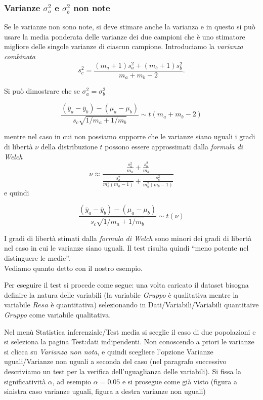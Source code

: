 \documentclass[
  11pt,
]{book}
\begin{document}
\hypertarget{varianze-sigma2_a-e-sigma2_b-non-note}{%
\subsubsection{\texorpdfstring{Varianze \(\sigma^2_a\) e \(\sigma^2_b\) non note}{Varianze \textbackslash sigma\^{}2\_a e \textbackslash sigma\^{}2\_b non note}}\label{varianze-sigma2_a-e-sigma2_b-non-note}}

Se le varianze non sono note, si deve stimare anche la varianza e in questo si può usare la media ponderata delle varianze dei due campioni che è uno stimatore migliore delle singole varianze di ciascun campione.
Introduciamo la \emph{varianza combinata}
\[
s_c^2 = \frac{(m_a+1)s_a^2+(m_b+1)s_b^2}{m_a+m_b-2}.
\]

Si può dimostrare che se \(\sigma^2_a=\sigma^2_b\)

\[
\frac{(\bar y_a - \bar y_b)-(\mu_a-\mu_b)}{s_c\sqrt{1/m_a+1/m_b}} \sim t(m_a+m_b-2)
\]

mentre nel caso in cui non possiamo supporre che le varianze siano uguali i gradi di libertà \(\nu\) della distribuzione \(t\) possono essere approssimati dalla \emph{formula di Welch}
\[
\nu \approx \frac{\frac{s^2_a}{m_a}+\frac{s^2_b}{m_b}}{\frac{s^2_a}{m_a^2(m_a-1)}+\frac{s^2_b}{m_b^2(m_b-1)}}
\]
e quindi

\[
\frac{(\bar y_a - \bar y_b)-(\mu_a-\mu_b)}{s_c\sqrt{1/m_a+1/m_b}} \sim t(\nu)
\]

I gradi di libertà stimati dalla \emph{formula di Welch} sono minori dei gradi di libertà nel caso in cui le varianze siano uguali. Il test risulta quindi ``meno potente nel distinguere le medie''.\\
Vediamo quanto detto con il nostro esempio.

Per eseguire il test si procede come segue: una volta caricato il dataset bisogna definire la natura delle variabili (la variabile \emph{Gruppo} è qualitativa mentre la variabile \(Resa\) è quantitativa) selezionando in Dati/Variabili/Variabili quantitaive \emph{Gruppo} come variabile qualitativa.

Nel menù Statistica inferenziale/Test media si sceglie il caso di due popolazioni e si seleziona la pagina Test:dati indipendenti. Non conoscendo a priori le varianze si clicca su \emph{Varianza non nota}, e quindi scegliere l'opzione Varianze uguali/Varianze non uguali a seconda del caso (nel paragrafo successivo descriviamo un test per la verifica dell'uguaglianza delle variabili).
Si fissa la significatività \(\alpha\), ad esempio \(\alpha = 0.05\) e si prosegue come già visto (figura a sinistra caso varianze uguali, figura a destra varianze non uguali)
\end{document}
